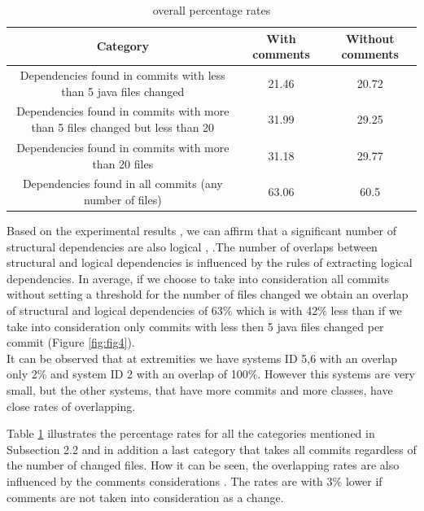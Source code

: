 \documentclass[conference,compsoc]{IEEEtran}
\begin{document}
\begin{table}[h]
  \centering
  \begin{tabular}{@{}c||cc@{}}
    \toprule
       Category & With comments & Without comments  \\
    \midrule
 Dependencies found in commits with less than 5 java files changed	&	21.46 &	20.72	\\
Dependencies found in commits with more than 5 files changed but less than 20	&	31.99 &	29.25\\
 Dependencies found in commits with more than 20 files	&	31.18	&	29.77\\
Dependencies found  in all commits (any number of files) & 63.06 & 60.5 \\
    \bottomrule
  \end{tabular}
  \caption{ overall percentage rates }
   \label{table:7}
\end{table}
Based on the experimental results , we can affirm that a significant number of structural dependencies are also logical \cite{ct10}, \cite{ct9}.The number of overlaps between structural and logical dependencies is influenced by the rules of extracting logical dependencies. In average, if we choose to take into consideration all commits without setting a threshold for the number of files changed we obtain an overlap of structural and logical dependencies of 63\% which is with 42\% less than if we take into consideration only commits with less then 5 java files changed per commit (Figure \ref{fig:fig4}). \\ It can be observed that at extremities we have systems ID 5,6 with an overlap only 2\% and system ID 2 with an overlap of 100\%. However this systems are very small, but the other systems, that have more commits and more classes, have close rates of overlapping.


Table \ref{table:7} illustrates the percentage rates for all the categories mentioned in Subsection 2.2 and in addition a last category that takes all commits regardless of the number of changed files. How it can be seen, the overlapping rates are also influenced by the comments considerations . The rates are with 3\% lower if comments are not taken into consideration as a change. 
\end{document}
